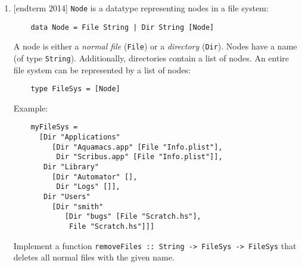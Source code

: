 \documentclass{article}
\def\code#1{\texttt{#1}}
\begin{document}
\begin{enumerate}
    \item {[endterm 2014]} \code{Node} is a datatype representing nodes in a file system:
        \begin{verbatim}
    data Node = File String | Dir String [Node]
        \end{verbatim}
        A node is either a \textit{normal file} (\code{File}) or a \textit{directory} (\code{Dir}). Nodes have a name (of type \code{String}). Additionally, directories contain a list of nodes. An entire file system can be represented by a list of nodes:
        \begin{verbatim}
    type FileSys = [Node]
        \end{verbatim}
        Example:
        \begin{verbatim}
    myFileSys =
      [Dir "Applications"
         [Dir "Aquamacs.app" [File "Info.plist"],
          Dir "Scribus.app" [File "Info.plist"]],
       Dir "Library"
         [Dir "Automator" [],
          Dir "Logs" []],
       Dir "Users"
         [Dir "smith"
            [Dir "bugs" [File "Scratch.hs"],
             File "Scratch.hs"]]]
        \end{verbatim}
        Implement a function \code{removeFiles :: String -> FileSys -> FileSys} that deletes all normal files with the given name.
\end{enumerate}
\end{document}
